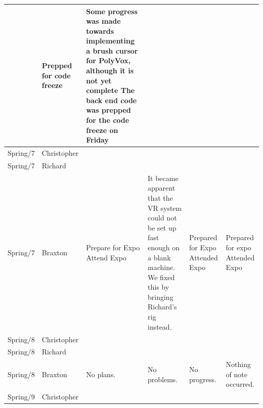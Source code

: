 \documentclass[onecolumn, draftclsnofoot,10pt, compsoc]{IEEEtran}
\begin{document}
\begin{tiny}
\begin{longtable}{ | p{} | p{} | p{} | p{} | p{} | p{} | }
&

Prepped for code freeze 

&

Some progress was made towards implementing a brush cursor for PolyVox, although it is not yet complete \newline
The back end code was prepped for the code freeze on Friday 

\\ \hline
Spring/7 & Christopher & 

&

&

&

\\ \hline
Spring/7 & Richard & 

&

&

&

\\ \hline
Spring/7 & Braxton & 

Prepare for Expo \newline
Attend Expo 

&

It became apparent that the VR system could not be set up fast enough on a blank machine. We fixed this by bringing Richard's rig instead. 

&

Prepared for Expo 
Attended Expo 

&

Prepared for expo 
Attended Expo 

\\ \hline
Spring/8 & Christopher & 

&

&

&

\\ \hline
Spring/8 & Richard & 

&

&

&

\\ \hline
Spring/8 & Braxton & 

No plans.

&

No problems.

&

No progress.

&

Nothing of note occurred.

\\ \hline
Spring/9 & Christopher & 


\end{longtable}
\end{tiny}
\end{document}
